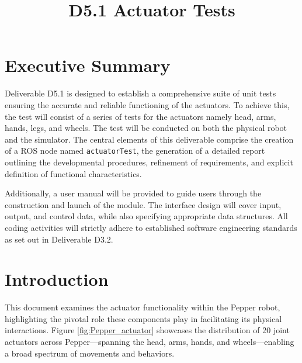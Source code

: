 \documentclass{CSSRforAfrica}
\begin{document}



\title{D5.1 Actuator Tests}    

\partner{}                                      




\maketitle

\section*{Executive Summary}
Deliverable D5.1 is designed to establish a comprehensive suite of unit tests ensuring the accurate 
and reliable functioning of the actuators. To achieve this, the test will consist of a series of tests 
for the actuators namely head, arms, hands, legs, and wheels. The test will be conducted on both the physical robot 
and the simulator. The central elements of this deliverable comprise the creation of a ROS node named \texttt{actuatorTest},
the generation of a detailed report outlining the developmental procedures, refinement of requirements, and 
explicit definition of functional characteristics. 

Additionally, a user manual will be provided to guide users through the construction and launch of the module. The interface 
design will cover input, output, and control data, while also specifying appropriate data structures. All coding activities 
will strictly adhere to established software engineering standards as set out in Deliverable D3.2. 
\label{executive_summary}

\pagebreak
\tableofcontents

\newpage

\pagebreak

\section{Introduction}
This document examines the actuator functionality within the Pepper robot, highlighting the pivotal role these components 
play in facilitating its physical interactions. Figure \ref{fig:Pepper_actuator} showcases the distribution of 20 joint 
actuators across Pepper—spanning the head, arms, hands, and wheels—enabling a broad spectrum of movements and behaviors.
\end{document}
